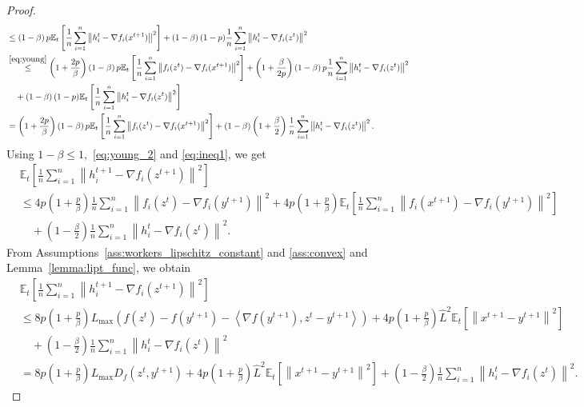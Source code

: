 \documentclass{article} %
\newcommand{\norm}[1]{\left\| #1 \right\|}
\newcommand{\inp}[2]{\left\langle#1,#2\right\rangle} %
\newcommand{\ExpSub}[2]{{\mathbb{E}}_{#1}\left[#2\right]}
\theoremstyle{plain}
\theoremstyle{definition}
\theoremstyle{remark}
\begin{document}
\begin{proof}
\begin{align*}
    &\leq\left(1 - \beta\right) p \ExpSub{t}{\frac{1}{n}\sum_{i=1}^n \norm{h^{t}_i - \nabla f_i(x^{t+1})}^2} + \left(1 - \beta\right) (1 - p) \frac{1}{n}\sum_{i=1}^n \norm{h^{t}_i - \nabla f_i(z^{t})}^2 \\
    &\overset{\eqref{eq:young}}{\leq}\left(1 + \frac{2 p}{\beta}\right)\left(1 - \beta\right) p \ExpSub{t}{\frac{1}{n}\sum_{i=1}^n \norm{f_i(z^t) - \nabla f_i(x^{t+1})}^2} + \left(1 + \frac{\beta}{2 p}\right)\left(1 - \beta\right) p \frac{1}{n}\sum_{i=1}^n \norm{h^{t}_i - \nabla f_i(z^t)}^2 \\
    &\quad + \left(1 - \beta\right) (1 - p) \ExpSub{t}{\frac{1}{n}\sum_{i=1}^n \norm{h^{t}_i - \nabla f_i(z^{t})}^2} \\
    &=\left(1 + \frac{2 p}{\beta}\right) \left(1 - \beta\right) p \ExpSub{t}{\frac{1}{n}\sum_{i=1}^n \norm{f_i(z^t) - \nabla f_i(x^{t+1})}^2} + \left(1 - \beta\right) \left(1 + \frac{\beta}{2}\right) \frac{1}{n}\sum_{i=1}^n \norm{h^{t}_i - \nabla f_i(z^t)}^2.
  \end{align*}
  Using $1 - \beta \leq 1,$ \eqref{eq:young_2} and \eqref{eq:ineq1}, we get
  \begin{align*}
    &\ExpSub{t}{\frac{1}{n}\sum_{i=1}^n \norm{h_i^{t+1} - \nabla f_i(z^{t+1})}^2} \\
    &\leq 4 p \left(1 + \frac{p}{\beta}\right) \frac{1}{n}\sum_{i=1}^n \norm{f_i(z^t) - \nabla f_i(y^{t+1})}^2 + 4 p \left(1 + \frac{p}{\beta}\right) \ExpSub{t}{\frac{1}{n}\sum_{i=1}^n \norm{f_i(x^{t+1}) - \nabla f_i(y^{t+1})}^2} \\
    &\quad + \left(1 - \frac{\beta}{2}\right) \frac{1}{n}\sum_{i=1}^n \norm{h^{t}_i - \nabla f_i(z^t)}^2.
  \end{align*}
  From Assumptions~\ref{ass:workers_lipschitz_constant} and \ref{ass:convex} and Lemma~\ref{lemma:lipt_func}, we obtain
  \begin{align*}
    &\ExpSub{t}{\frac{1}{n}\sum_{i=1}^n \norm{h_i^{t+1} - \nabla f_i(z^{t+1})}^2} \\
    &\leq 8 p \left(1 + \frac{p}{\beta}\right) L_{\max} \left(f(z^t) - f(y^{t+1}) - \inp{\nabla f(y^{t+1})}{z^t - y^{t+1}}\right) + 4 p \left(1 + \frac{p}{\beta}\right) \widehat{L}^2 \ExpSub{t}{\norm{x^{t+1} - y^{t+1}}^2} \\
    &\quad + \left(1 - \frac{\beta}{2}\right) \frac{1}{n}\sum_{i=1}^n \norm{h^{t}_i - \nabla f_i(z^t)}^2 \\
    &= 8 p \left(1 + \frac{p}{\beta}\right) L_{\max} D_f(z^t, y^{t+1}) + 4 p \left(1 + \frac{p}{\beta}\right) \widehat{L}^2 \ExpSub{t}{\norm{x^{t+1} - y^{t+1}}^2} + \left(1 - \frac{\beta}{2}\right) \frac{1}{n}\sum_{i=1}^n \norm{h^{t}_i - \nabla f_i(z^t)}^2.
  \end{align*}
\end{proof}
\end{document}
